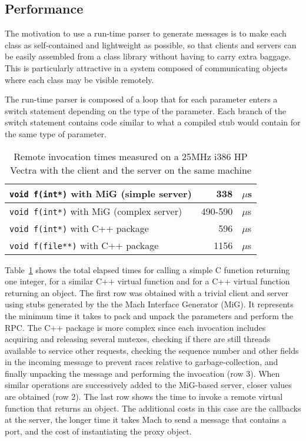 \subsection{Performance}

The motivation to use a run-time parser to generate messages is
to make each class as self-contained and lightweight as possible, so
that clients and servers can be easily assembled from a class
library without having to carry extra baggage. This is particularly
attractive in a system composed of communicating objects where each
class may be visible remotely.

The run-time parser is composed of a loop that for each parameter
enters a switch statement depending on the type of the parameter. Each
branch of the switch statement contains code similar to what a
compiled stub would contain for the same type of parameter.

\begin{table}[htbp]
\begin{center}
\begin{tabular}{||l|rl||} \hline
{\tt void f(int*)} with MiG (simple server) 	& 338	& $\mu$s \\ \hline
{\tt void f(int*)} with MiG (complex server)	& 490-590& $\mu$s \\ \hline
{\tt void f(int*)} with C++ package		& 596	& $\mu$s \\ \hline
{\tt void f(file**)} with C++ package		& 1156	& $\mu$s  \\ \hline
\end{tabular}
\caption{Remote invocation times measured on a 25MHz i386 HP Vectra
with the client and the server on the same machine}
\label{tab1}
\end{center}
\end{table}

Table~\ref{tab1} shows the total elapsed times for calling a simple C
function returning one integer, for a similar C++ virtual function and
for a C++ virtual function returning an object.
The first row was obtained with a trivial client and server using
stubs generated by the the Mach Interface Generator (MiG). It
represents the minimum time it takes to pack and unpack the parameters
and perform the RPC. The C++ package is more complex since each
invocation includes acquiring and releasing several mutexes, checking
if there are still threads available to service other requests,
checking the sequence number and other fields in the incoming message
to prevent races relative to garbage-collection, and finally unpacking
the message and performing the invocation (row 3). When similar
operations are  successively added to the MiG-based server, closer
values are obtained (row 2). The last row shows the time to invoke a
remote virtual function that returns an object. The additional costs
in this case are the callbacks at the server, the longer time it takes
Mach to send a message that contains a port, and the cost of
instantiating the proxy object.

